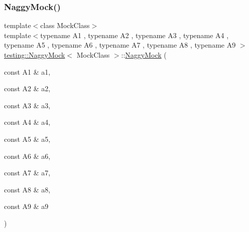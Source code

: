 \mbox{\label{classtesting_1_1_naggy_mock_a786f31ade7b8b9f6e78e07f51cc0e14b}} 
\subsubsection{\texorpdfstring{NaggyMock()}{NaggyMock()}\hspace{0.1cm}{\footnotesize\ttfamily [16/17]}}
{\footnotesize\ttfamily template$<$class Mock\+Class$>$ \\
template$<$typename A1 , typename A2 , typename A3 , typename A4 , typename A5 , typename A6 , typename A7 , typename A8 , typename A9 $>$ \\
\mbox{\hyperlink{classtesting_1_1_naggy_mock}{testing\+::\+Naggy\+Mock}}$<$ Mock\+Class $>$\+::\mbox{\hyperlink{classtesting_1_1_naggy_mock}{Naggy\+Mock}} (\begin{DoxyParamCaption}\item[{const A1 \&}]{a1,  }\item[{const A2 \&}]{a2,  }\item[{const A3 \&}]{a3,  }\item[{const A4 \&}]{a4,  }\item[{const A5 \&}]{a5,  }\item[{const A6 \&}]{a6,  }\item[{const A7 \&}]{a7,  }\item[{const A8 \&}]{a8,  }\item[{const A9 \&}]{a9 }\end{DoxyParamCaption})\hspace{0.3cm}{\ttfamily [inline]}}

\mbox{\label{classtesting_1_1_naggy_mock_aa40a39806b939f423696f9380de3172b}} 
